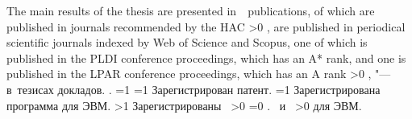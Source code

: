 {\begin{refsection}
        {\publications} The main results of the thesis are presented in~~publications,
         of which are published in journals recommended by the HAC\sloppy%
        \ifnum \value{citeauthorscopuswos}>0%
            ,  are published in periodical scientific journals indexed by Web of Science and Scopus, one of which is published in the PLDI conference proceedings, which has an A* rank, and one is published in the LPAR conference proceedings, which has an A rank\sloppy%
        \fi%
        \ifnum \value{citeauthorconf}>0%
            ,  "--- в~тезисах докладов.
        \else%
            .
        \fi%
        \ifnum \value{citeregistered}=1%
            \ifnum \value{citeauthorpatent}=1%
                Зарегистрирован  патент.
            \fi%
            \ifnum \value{citeauthorprogram}=1%
                Зарегистрирована  программа для ЭВМ.
            \fi%
        \fi%
        \ifnum \value{citeregistered}>1%
            Зарегистрированы\ %
            \ifnum \value{citeauthorpatent}>0%
            \sloppy%
            \ifnum \value{citeauthorprogram}=0 . \else \ и~\fi%
            \fi%
            \ifnum \value{citeauthorprogram}>0%
             для ЭВМ.
            \fi%
        \fi%
    \end{refsection}%
    \begin{refsection}

\end{refsection}}
